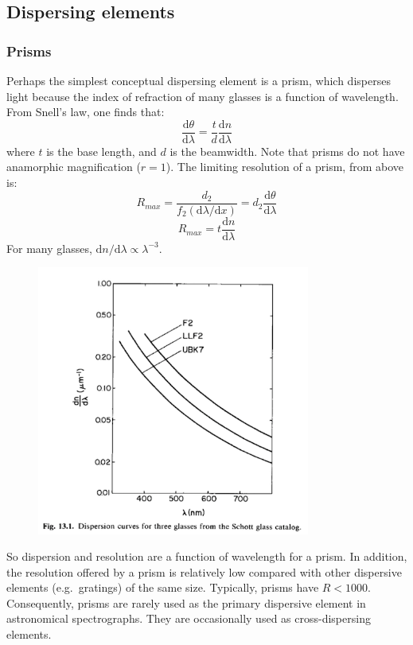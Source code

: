 \documentclass[12pt]{article}
\begin{document}
\subsection{Dispersing elements}
\subsubsection{Prisms}
Perhaps the simplest conceptual dispersing element is a prism, which
disperses light because the index of refraction of many glasses is a
function of wavelength. From Snell's law, one finds that:
\[
    \frac{\mathrm{d}\theta}{\mathrm{d}\lambda}
    = \frac{t}{d}\frac{\mathrm{d}n}{\mathrm{d}\lambda}
    \]
where $t$ is the base length, and $d$ is the beamwidth. Note that prisms
do not have anamorphic magnification ($r=1$). The limiting resolution
of a prism, from above is:
\[
    R_{max} = \frac{d_{2}}{f_{2}(\mathrm{d}\lambda/\mathrm{d}x)} =
    d_{2}\frac{\mathrm{d}\theta}{\mathrm{d}\lambda}
    \]
\[
    R_{max} = t\frac{\mathrm{d}n}{\mathrm{d}\lambda}
    \]
For many glasses, $\mathrm{d}n/\mathrm{d}\lambda \propto \lambda^{-3}$.
\begin{figure}
    \centering
    \includegraphics[width=0.8\textwidth]{curves.png}
\end{figure}
So dispersion and resolution are a function of wavelength for a prism.
In addition, the resolution offered by a prism is relatively low
compared with other dispersive elements (e.g.\ gratings) of the same
size. Typically, prisms have $R < 1000$. Consequently, prisms are rarely
used as the primary dispersive element in astronomical spectrographs.
They are occasionally used as cross-dispersing elements.
\end{document}
